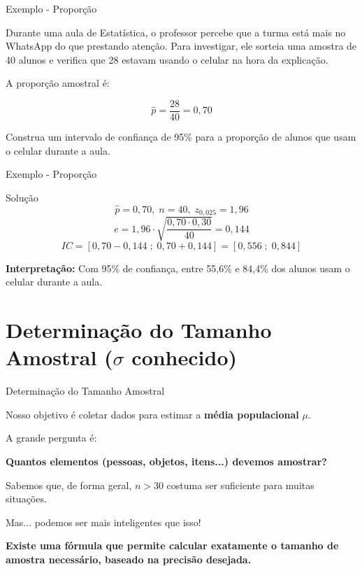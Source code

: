 \documentclass[14pt,aspectratio=1610]{beamer}
\begin{document}
	\begin{frame}{Exemplo - Proporção}
		\begin{block}{}
			\justifying
			Durante uma aula de Estatística, o professor percebe que a turma está mais no WhatsApp do que prestando atenção. Para investigar, ele sorteia uma amostra de 40 alunos e verifica que 28 estavam usando o celular na hora da explicação.
			
			A proporção amostral é:
			
			\[
			\hat{p} = \frac{28}{40} = 0,70
			\]
			
			Construa um intervalo de confiança de 95\% para a proporção de alunos que usam o celular durante a aula.
		\end{block}
		
	\end{frame}
	
	\begin{frame}{Exemplo - Proporção}
		
		\begin{block}{Solução}
			\[
			\hat{p} = 0,70, \; n = 40, \; z_{0,025} = 1,96
			\]
			\[
			e = 1,96 \cdot \sqrt{\frac{0,70 \cdot 0,30}{40}} = 0,144
			\]
			\[
			IC = [0,70 - 0,144 \; ; \; 0,70 + 0,144] = [0,556 \; ; \; 0,844]
			\]
			
			\textbf{Interpretação:} Com 95\% de confiança, entre 55,6\% e 84,4\% dos alunos usam o celular durante a aula.
		\end{block}
	\end{frame}
	
	\section{Determinação do Tamanho Amostral ($\sigma$ conhecido)}
	
	\begin{frame}{Determinação do Tamanho Amostral}
		\begin{block}{}
			\justifying
			Nosso objetivo é coletar dados para estimar a \textbf{média populacional} $\mu$.
			
			A grande pergunta é:
			
			\begin{center}
				\textbf{Quantos elementos (pessoas, objetos, itens...) devemos amostrar?}
			\end{center}
			
			Sabemos que, de forma geral, $n > 30$ costuma ser suficiente para muitas situações.
			
			Mas... podemos ser mais inteligentes que isso! 
			
			\textbf{Existe uma fórmula que permite calcular exatamente o tamanho de amostra necessário, baseado na precisão desejada.}
		\end{block}
	\end{frame}
	
\end{document}
